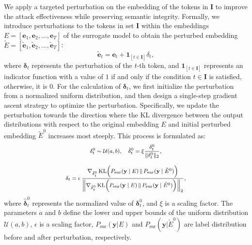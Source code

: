 We apply a targeted perturbation on the embedding of the tokens in $\mathbf{I}$ to improve the attack effectiveness while preserving semantic integrity.
Formally, we introduce perturbations to the tokens in set $\mathbf{I}$ within the embeddings $E = [\mathbf{e}_1, \mathbf{e}_2, \ldots, \mathbf{e}_T]$ of the surrogate model to obtain the perturbed embedding $\tilde{E} = [\tilde{\mathbf{e}}_1, \tilde{\mathbf{e}}_2, \ldots, \tilde{\mathbf{e}}_T]$:
\begin{equation}
\label{eq:4}
\tilde{\mathbf{e}}_t = \mathbf{e}_t + \mathbf{1} _{[t \in \mathbf{I}]}\delta_t, 
\end{equation}
where $\mathbf{\delta}_t$ represents the perturbation of the $t$-th token, and $\mathbf{1} _{[t \in \mathbf{I}]}$ represents an indicator function with a value of $1$ if and only if the condition $t \in \mathbf{I}$ is satisfied, otherwise, it is $0$.
For the calculation of $\mathbf{\delta}_t$, we first initialize the perturbation from a normalized uniform distribution, and then design a single-step gradient ascent strategy to optimize the perturbation.
Specifically, we update the perturbation towards the direction where the KL divergence between the output distributions with respect to the original embedding $E$ and initial perturbed embedding $\tilde{E}^{0}$ increases most steeply.
This process is formulated as:
\begin{equation}
\footnotesize
\label{pre}
\vcenter{\hbox{$\displaystyle 
\begin{gathered}
\mathbf{\delta}_t^{0} \sim \mathcal{U}(a, b),\quad 
\hat{\mathbf{\delta}}_t^{0} = \xi \frac{\mathbf{\delta}_t^{0}}{\|\mathbf{\delta}_t^{0}\|_2}, \\[6pt]
\mathbf{\delta}_t = \epsilon\,  
\frac{
  \nabla_{\hat{\mathbf{\delta}}_t^{0}}\,\text{KL}\Bigl(P_{\text{sur}}(\mathbf{y}\mid E) \,\|\, P_{\text{sur}}(\mathbf{y}\mid \tilde{E}^{0})\Bigr)
}{
  \Bigl\|\nabla_{\hat{\mathbf{\delta}}_t^{0}}\,\text{KL}\Bigl(P_{\text{sur}}(\mathbf{y}\mid E) \,\|\, P_{\text{sur}}(\mathbf{y}\mid \tilde{E}^{0})\Bigr)\Bigr\|_2
},
\end{gathered}
$}}
\end{equation}
where $\hat{\mathbf{\delta}}_t^{0}$ represents the normalized value of $\mathbf{\delta}_{t}^{0}$, and $\xi$ is a scaling factor. The parameters $a$ and $b$ define the lower and upper bounds of the uniform distribution $\mathcal{U}(a, b)$, $\epsilon$ is a scaling factor, $P_{\text{sur}}(\mathbf{y} | E)$ and $P_{\text{sur}}(\mathbf{y} | \tilde{E}^{0})$ are label distribution before and after perturbation, respectively.

